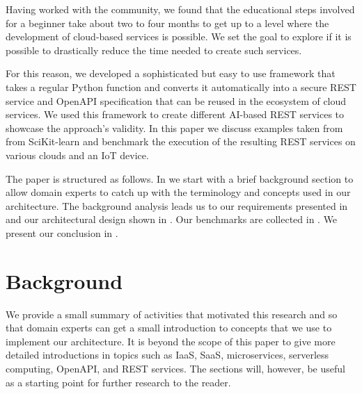 Having worked with the community, we found that the educational steps
involved for a beginner take about two to four months to get up to a
level where the development of cloud-based services is possible. We
set the goal to explore if it is possible to drastically reduce the
time needed to create such services.

For this reason, we developed a sophisticated but easy to use
framework that takes a regular Python function and converts it
automatically into a secure REST service and OpenAPI
specification \cite{openapi} that can be reused in the ecosystem of
cloud services. We used this framework to create different AI-based
REST services to showcase the approach's validity. In this paper we
discuss examples taken from from SciKit-learn \cite{scikit-learn} and
benchmark the execution of the resulting REST services on various
clouds and an IoT device.

The paper is structured as follows. In  we
start with a brief background section to allow domain
experts to catch up with the terminology and concepts used in our
architecture. The background analysis leads us to our requirements
presented in  and our architectural design
shown in . Our benchmarks are collected
in . We present our conclusion
in .

\section{Background}
\label{sec:background}

We provide a small summary of activities that motivated this research and so
that domain experts can get a small introduction to concepts that we
use to implement our architecture. It is beyond the scope of this
paper to give more detailed introductions in topics such as IaaS,
SaaS, microservices, serverless computing, OpenAPI, and REST
services. The sections will, however, be useful as a starting point
for further research to the reader.

